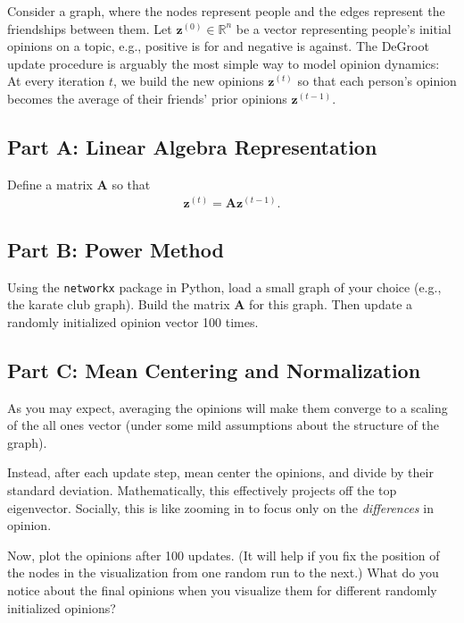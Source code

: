 \documentclass{article}
\begin{document}
Consider a graph, where the nodes represent people and the edges represent the friendships between them. Let \(\mathbf{z}^{(0)} \in \mathbb{R}^n\) be a vector representing people's initial opinions on a topic, e.g., positive is for and negative is against. The DeGroot update procedure is arguably the most simple way to model opinion dynamics: At every iteration \(t\), we build the new opinions \(\mathbf{z}^{(t)}\) so that each person's opinion becomes the average of their friends' prior opinions \(\mathbf{z}^{(t-1)}\).

\hypertarget{part-a-linear-algebra-representation}{%
\subsection*{Part A: Linear Algebra Representation}\label{part-a-linear-algebra-representation}}

Define a matrix \(\mathbf{A}\) so that \begin{align*}
    \mathbf{z}^{(t)} = \mathbf{A} \mathbf{z}^{(t-1)}.
\end{align*}

\hypertarget{part-b-power-method}{%
\subsection*{Part B: Power Method}\label{part-b-power-method}}

Using the \texttt{networkx} package in Python, load a small graph of your choice (e.g., the karate club graph). Build the matrix \(\mathbf{A}\) for this graph. Then update a randomly initialized opinion vector 100 times.

\hypertarget{part-c-mean-centering-and-normalization}{%
\subsection*{Part C: Mean Centering and Normalization}\label{part-c-mean-centering-and-normalization}}

As you may expect, averaging the opinions will make them converge to a scaling of the all ones vector (under some mild assumptions about the structure of the graph).

Instead, after each update step, mean center the opinions, and divide by their standard deviation. Mathematically, this effectively projects off the top eigenvector. Socially, this is like zooming in to focus only on the \emph{differences} in opinion.

Now, plot the opinions after 100 updates. (It will help if you fix the position of the nodes in the visualization from one random run to the next.) What do you notice about the final opinions when you visualize them for different randomly initialized opinions?
\end{document}
